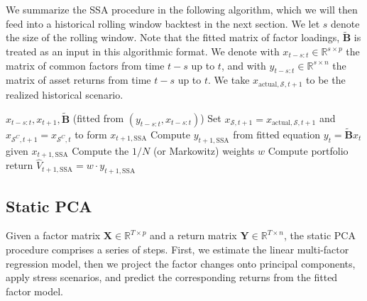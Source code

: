 \documentclass[11pt]{article}
\theoremstyle{plain}
\theoremstyle{definition}
\theoremstyle{remark}
\numberwithin{equation}{section}
\begin{document}
We summarize the SSA procedure in the following algorithm, which we will then feed into a historical rolling window backtest in the next section. We let $s$ denote the size of the rolling window. Note that the fitted matrix of factor loadings, $\mathbf{\tilde{B}}$ is treated as an input in this algorithmic format. We denote with $x_{t-s:t} \in \mathbb{R}^{s \times p}$ the matrix of common factors from time $t-s$ up to $t$, and with $y_{t-s:t} \in \mathbb{R}^{s \times n}$ the matrix of asset returns from time $t-s$ up to $t$. We take $x_{\mathrm{actual},\mathcal{S}, t+1}$ to be the realized historical scenario.

\begin{algorithm}[H]
\caption{SSA Portfolio Simulation} \label{alg:ssa}
\begin{algorithmic}[1]
\Require $x_{t-s:t}, x_{t+1}, \mathbf{\tilde{B}}$ (fitted from $(y_{t-s:t}, x_{t-s:t})$)
\State Set $x_{\mathcal{S},t+1}=x_{\mathrm{actual},\mathcal{S}, t+1}$ and $x_{\mathcal{S}^C,t+1}=x_{\mathcal{S}^C,t}$ to form $x_{t+1, \mathrm{SSA}}$
\State Compute $y_{t+1, \mathrm{SSA}}$ from fitted equation $y_t = \mathbf{\tilde{B}} x_t$ given $x_{t+1, \mathrm{SSA}}$
\State Compute the $1/N$ (or Markowitz) weights $w$
\State Compute portfolio return $\hat{V}_{t+1, \mathrm{SSA}}=w \cdot y_{t+1,\mathrm{SSA}}$
\end{algorithmic}
\end{algorithm}

\subsection{Static PCA}
\label{app:static_pca}
Given a factor matrix \( \mathbf{X} \in \mathbb{R}^{T \times p} \) and a return matrix \( \mathbf{Y} \in \mathbb{R}^{T \times n} \), the static PCA procedure comprises a series of steps. First, we estimate the linear multi-factor regression model, then we project the factor changes onto principal components, apply stress scenarios, and predict the corresponding returns from the fitted factor model.
\end{document}
